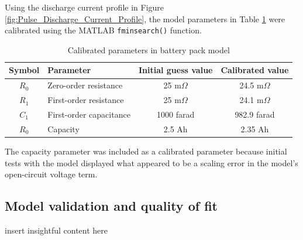 \documentclass[../SimBALink.tex]{subfiles}
\begin{document}
			Using the discharge current profile in Figure \ref{fig:Pulse_Discharge_Current_Profile}, the model parameters in Table \ref{table:battery_calibrated_parameters} were calibrated using the MATLAB \texttt{fminsearch()} function.
			
			\begin{table}
				\centering
				\caption{Calibrated parameters in battery pack model}
				\label{table:battery_calibrated_parameters}
				\begin{tabular}{c | l | c | c}
					Symbol		&	Parameter			&	Initial guess value	&	Calibrated value	\\
					\hline
					$R_0$		&	Zero-order resistance	&	25 m$\Omega$	&	24.5 m$\Omega$	\\
					$R_1$		&	First-order resistance	&	25 m$\Omega$	&	24.1 m$\Omega$	\\
					$C_1$		&	First-order capacitance	&	1000 farad		&	982.9 farad		\\
					$R_0$		&	Capacity				&	2.5 Ah			&	2.35 Ah
				\end{tabular}
			\end{table}
			
			The capacity parameter was included as a calibrated parameter because initial tests with the model displayed what appeared to be a scaling error in the model's open-circuit voltage term.
			
	\subsection{Model validation and quality of fit}
		insert insightful content here
		
		
\end{document}
